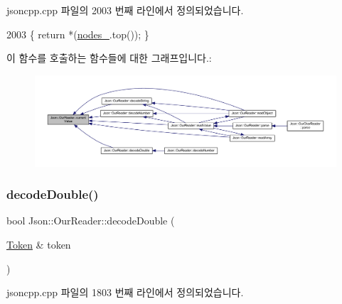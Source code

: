 jsoncpp.\+cpp 파일의 2003 번째 라인에서 정의되었습니다.


\begin{DoxyCode}
2003 \{ \textcolor{keywordflow}{return} *(\hyperlink{class_json_1_1_our_reader_a19cc4e8c5d17ee6822f752e9a36f4ce3}{nodes\_}.top()); \}
\end{DoxyCode}
이 함수를 호출하는 함수들에 대한 그래프입니다.\+:\nopagebreak
\begin{figure}[H]
\begin{center}
\leavevmode
\includegraphics[width=350pt]{class_json_1_1_our_reader_a2acd5b1d53e7d7e17c21ff8e96edc09d_icgraph}
\end{center}
\end{figure}
\mbox{\label{class_json_1_1_our_reader_a1d1c3b44f6720a0e7c39b5ae8de3981c}} 
\subsubsection{\texorpdfstring{decode\+Double()}{decodeDouble()}\hspace{0.1cm}{\footnotesize\ttfamily [1/2]}}
{\footnotesize\ttfamily bool Json\+::\+Our\+Reader\+::decode\+Double (\begin{DoxyParamCaption}\item[{\hyperlink{class_json_1_1_our_reader_1_1_token}{Token} \&}]{token }\end{DoxyParamCaption})\hspace{0.3cm}{\ttfamily [private]}}



jsoncpp.\+cpp 파일의 1803 번째 라인에서 정의되었습니다.


